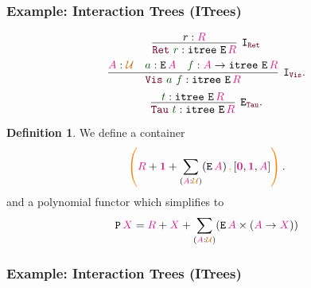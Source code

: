 \documentclass[xelatex,mathserif,serif,notheorems]{beamer} %
\theoremstyle{plain} %
\theoremstyle{definition}
\newtheorem{defn}[thm]{Definition}%
\theoremstyle{remark}
\newcommand*{\term}[1]{\textcolor{green!30!black}{#1}} %
\newcommand*{\type}[1]{\textcolor{magenta!90!black}{#1}}
\newcommand*{\containerpair}[2]{\ensuremath{\colorlet{savedleftcolor}{.}\color{orange}\left(\color{savedleftcolor}#1\,\textcolor{orange}{\mathbf{,}}\,#2\color{orange}\right)\color{savedleftcolor}}}
\newcommand*{\universe}[1]{\textcolor{orange!80!black}{#1}}
\newcommand*{\unit}{\type{\textbf{1}}}
\newcommand*{\empt}{\type{\textbf{0}}}
\newcommand*{\function}[1]{\textcolor{blue!60!black}{\ensuremath{\mathtt{#1}}}}
\newcommand*{\constructor}[1]{\textcolor{purple!60!black}{\ensuremath{\mathtt{#1}}}}
\newcommand*{\typeformer}[1]{\ensuremath{\mathtt{#1}}}
\newcommand*{\functor}[1]{\ensuremath{\mathbf{\mathtt{#1}}}}
\newcommand{\setlengths}{
  \setlength{\abovedisplayskip}{4pt}
  \setlength{\belowdisplayskip}{4pt}
  \setlength{\abovedisplayshortskip}{2pt}
  \setlength{\belowdisplayshortskip}{2pt}
}
\begin{document}
\begin{frame}
  \frametitle{Example: Interaction Trees (ITrees)}
  \begin{equation}
    \vcenter{\infer[\mathtt{I}_{\constructor{Ret}}]{\constructor{Ret}~\term{r} : \typeformer{itree}~\typeformer{E}\,\type{R}}{r : \type{R}}}
  \end{equation}
  \begin{equation}
    \vcenter{\infer[\mathtt{I}_{\constructor{Vis}}]{\constructor{Vis}~\term{a}~\term{f} : \typeformer{itree}~\typeformer{E}\,\type{R}}{\type{A} : \universe{\mathcal{U}} & \term{a} : \typeformer{E}\,\type{A} & \term{f} : \type{A} \rightarrow \typeformer{itree}~\typeformer{E}\,\type{R}}}.
  \end{equation}
  \begin{equation}
    \vcenter{\infer[\mathtt{E}_{\constructor{Tau}}]{\constructor{Tau}~\term{t} : \typeformer{itree}~\typeformer{E}\,\type{R}}{\term{t} : \typeformer{itree}~\typeformer{E}\,\type{R}}}.
  \end{equation}
  \begin{defn}\setlengths
    We define a container
    \begin{equation}
      \containerpair{\type{R}+\unit+\sum_{(\type{A}:\universe{\mathcal{U}})} (\typeformer{E}\,\type{A})}{[\empt , \unit , \type{A}]}.
    \end{equation}
    and a polynomial functor which simplifies to
    \begin{equation}
      \functor{P}\,\type{X} = \type{R} + \type{X} + \sum_{(\type{A} : \universe{\mathcal{U}})} (\typeformer{E}\,\type{A} \times (\type{A} \rightarrow \type{X}))
    \end{equation}
  \end{defn}
\end{frame}

\begin{frame}[shrink=36,fragile]
  \frametitle{Example: Interaction Trees (ITrees)}
  \vspace{35mm}
  \begin{figure}[h]
    \centering
  \end{figure}
\end{frame}
\end{document}
